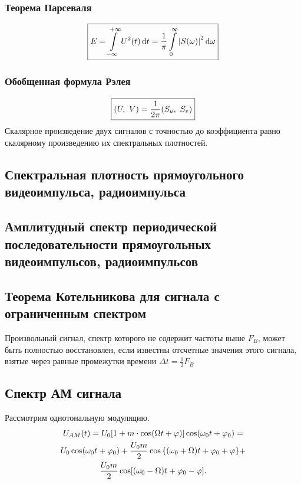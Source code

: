 \documentclass[a4paper,14pt]{extarticle}
\gdef\newint{\int\limits_{-\infty}^{+\infty}}
\theoremstyle{definition}
\begin{document}
\subsubsection{Теорема Парсеваля}
\begin{equation}
	\boxed{
	E=\newint U^2(t) \dd{t}= \frac{1}{\pi}\int\limits_0^{\infty} \abs{S(\omega)}^2 \dd{\omega}
	}
\end{equation}
\subsubsection{Обобщенная формула Рэлея}

\begin{equation}
\boxed{
	\qty(U,~V)=\frac{1}{2\pi}\qty(S_u,~S_v)
		}
\end{equation}
Скалярное произведение двух сигналов с точностью до коэффициента равно скалярному произведению их спектральных плотностей.
\subsection{Спектральная плотность прямоугольного видеоимпульса, радиоимпульса}


\subsection{Амплитудный спектр периодической последовательности прямоугольных видеоимпульсов,
радиоимпульсов}

\subsection{Теорема Котельникова для сигнала с ограниченным спектром}

Произвольный сигнал, спектр которого не содержит частоты выше $F_B$, может быть полностью восстановлен, если известны отсчетные значения этого сигнала, взятые через равные промежутки времени $\Delta t=\frac12 F_B$

\subsection{Спектр АМ сигнала}
Рассмотрим однотональную модуляцию.
\begin{gather*}
	U_{AM}(t)=
	U_0\qty[1+m\cdot \cos(\Omega t + \varphi) ]\cos(\omega_0 t+ \varphi_0)=
	\\
	U_0\cos(\omega_0 t + \varphi_0)+
		\frac{U_0m}{2}\cos\qty{(\omega_0+\Omega)t+\varphi_0+\varphi}+
	\\
	\frac{U_0m}{2}\cos[(\omega_0- \Omega)t+\varphi_0- \varphi].
\end{gather*}
\end{document}
